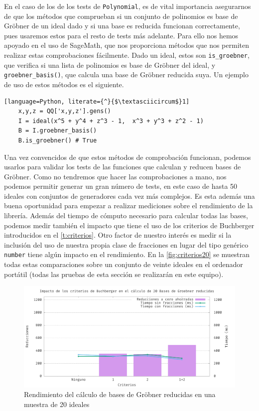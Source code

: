 En el caso de los de los tests de \texttt{Polynomial}, es de vital importancia asegurarnos de que los métodos que comprueban si un conjunto de polinomios es base de Gröbner de un ideal dado y si una base es reducida funcionan correctamente, pues usaremos estos para el resto de tests más adelante. Para ello nos hemos apoyado en el uso de SageMath, que nos proporciona métodos que nos permiten realizar estas comprobaciones fácilmente. Dado un ideal, estos son \texttt{is\_groebner}, que verifica si una lista de polinomios es base de Gröbner del ideal, y \texttt{groebner\_basis()}, que calcula una base de Gröbner reducida suya. Un ejemplo de uso de estos métodos es el siguiente.
\begin{lstlisting}[language=Python, literate={^}{$\textasciicircum$}1]
    x,y,z = QQ['x,y,z'].gens()
    I = ideal(x^5 + y^4 + z^3 - 1,  x^3 + y^3 + z^2 - 1)
    B = I.groebner_basis()
    B.is_groebner() # True
\end{lstlisting}
Una vez convencidos de que estos métodos de comprobación funcionan, podemos usarlos para validar los tests de las funciones que calculan y reducen bases de Gröbner. Como no tendremos que hacer las comprobaciones a mano, nos podemos permitir generar un gran número de tests, en este caso de hasta 50 ideales con conjuntos de generadores cada vez más complejos. Es esta además una buena oportunidad para empezar a realizar mediciones sobre el rendimiento de la librería. Además del tiempo de cómputo necesario para calcular todas las bases, podemos medir también el impacto que tiene el uso de los criterios de Buchberger introducidos en el \autoref{t:criterios}. Otro factor de nuestro interés es medir si la inclusión del uso de nuestra propia clase de fracciones en lugar del tipo genérico \texttt{number} tiene algún impacto en el rendimiento. En la \autoref{fig:criterios20} se muestran todas estas comparaciones sobre un conjunto de veinte ideales en el ordenador portátil (todas las pruebas de esta sección se realizarán en este equipo).\newline
\begin{figure}[!ht]
    \centering
    \includegraphics[width=\textwidth]{Plantilla-TFG-master/img/graficas/Criterios20-2.png}
    \caption{Rendimiento del cálculo de bases de Gröbner reducidas en una muestra de 20 ideales}
    \label{fig:criterios20}
\end{figure}

